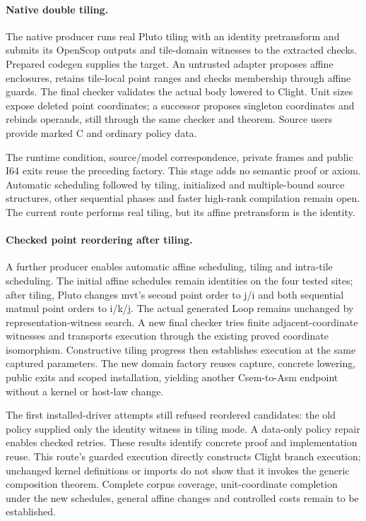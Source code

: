 \paragraph{Native double tiling.}
The native producer runs real Pluto tiling with an identity pretransform and
submits its OpenScop outputs and tile-domain witnesses to the extracted checks.
Prepared codegen supplies the target. An untrusted adapter proposes affine
enclosures, retains tile-local point ranges and checks membership through
affine guards. The final checker validates the actual body lowered to Clight.
Unit sizes expose deleted point coordinates; a successor proposes singleton
coordinates and rebinds operands, still through the same checker and theorem.
Source users provide marked C and ordinary policy data.

The runtime condition, source/model correspondence, private frames and public
I64 exits reuse the preceding factory. This stage adds no semantic proof or
axiom. Automatic scheduling followed by tiling, initialized and multiple-bound
source structures, other sequential phases and faster high-rank compilation
remain open. The current route performs real tiling, but its affine pretransform
is the identity.

\paragraph{Checked point reordering after tiling.}
A further producer enables automatic affine scheduling, tiling and intra-tile
scheduling. The initial affine schedules remain identities on the four tested
sites; after tiling, Pluto changes mvt's second point order to j/i and both
sequential matmul point orders to i/k/j. The actual generated Loop remains
unchanged by representation-witness search. A new final checker tries finite
adjacent-coordinate witnesses and transports execution through the existing
proved coordinate isomorphism. Constructive tiling progress then establishes
execution at the same captured parameters. The new domain factory reuses
capture, concrete lowering, public exits and scoped installation, yielding
another Csem-to-Asm endpoint without a kernel or host-law change.

The first installed-driver attempts still refused reordered candidates: the
old policy supplied only the identity witness in tiling mode. A data-only
policy repair enables checked retries. These results identify concrete proof
and implementation reuse. This route's guarded execution directly constructs
Clight branch execution; unchanged kernel definitions or imports do not show
that it invokes the generic composition theorem. Complete corpus coverage,
unit-coordinate completion under the new schedules, general affine changes
and controlled costs remain to be established.

